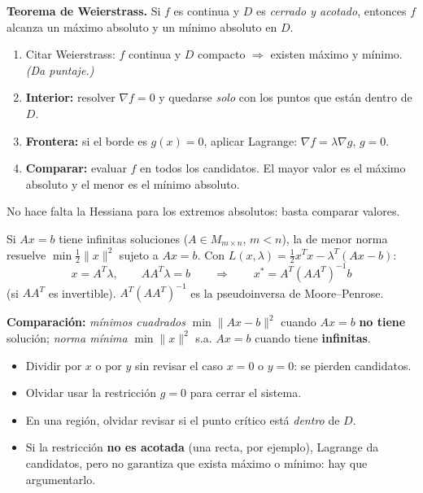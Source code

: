 \documentclass[11pt,a4paper]{article}
\begin{document}
\begin{resumen}
\textbf{Teorema de Weierstrass.} Si $f$ es continua y $D$ es \emph{cerrado y acotado}, entonces $f$ alcanza un máximo absoluto y un mínimo absoluto en $D$.

\begin{receta}
\begin{enumerate}[leftmargin=*,itemsep=1pt]
\item Citar Weierstrass: $f$ continua y $D$ compacto $\Rightarrow$ existen máximo y mínimo. \emph{(Da puntaje.)}
\item \textbf{Interior:} resolver $\nabla f=0$ y quedarse \emph{solo} con los puntos que están dentro de $D$.
\item \textbf{Frontera:} si el borde es $g(x)=0$, aplicar Lagrange: $\nabla f=\lambda\nabla g$, $g=0$.
\item \textbf{Comparar:} evaluar $f$ en todos los candidatos. El mayor valor es el máximo absoluto y el menor es el mínimo absoluto.
\end{enumerate}
\end{receta}
No hace falta la Hessiana para los extremos absolutos: basta comparar valores.
\end{resumen}

\begin{resumen}
Si $Ax=b$ tiene infinitas soluciones ($A\in M_{m\times n}$, $m<n$), la de menor norma resuelve
$\min \tfrac12\|x\|^2$ sujeto a $Ax=b$. Con $L(x,\lambda)=\tfrac12 x^Tx-\lambda^T(Ax-b)$:
\[
x=A^T\lambda,\qquad AA^T\lambda=b\qquad\Longrightarrow\qquad \boxed{x^*=A^T(AA^T)^{-1}b}
\]
(si $AA^T$ es invertible). $A^T(AA^T)^{-1}$ es la pseudoinversa de Moore--Penrose.

\smallskip
\textbf{Comparación:} \emph{mínimos cuadrados} $\min\|Ax-b\|^2$ cuando $Ax=b$ \textbf{no tiene} solución; \emph{norma mínima} $\min\|x\|^2$ s.a. $Ax=b$ cuando tiene \textbf{infinitas}.
\end{resumen}

\begin{ojo}
\begin{itemize}[leftmargin=*,itemsep=1pt]
\item Dividir por $x$ o por $y$ sin revisar el caso $x=0$ o $y=0$: se pierden candidatos.
\item Olvidar usar la restricción $g=0$ para cerrar el sistema.
\item En una región, olvidar revisar si el punto crítico está \emph{dentro} de $D$.
\item Si la restricción \textbf{no es acotada} (una recta, por ejemplo), Lagrange da candidatos, pero no garantiza que exista máximo o mínimo: hay que argumentarlo.
\end{itemize}
\end{ojo}
\end{document}
